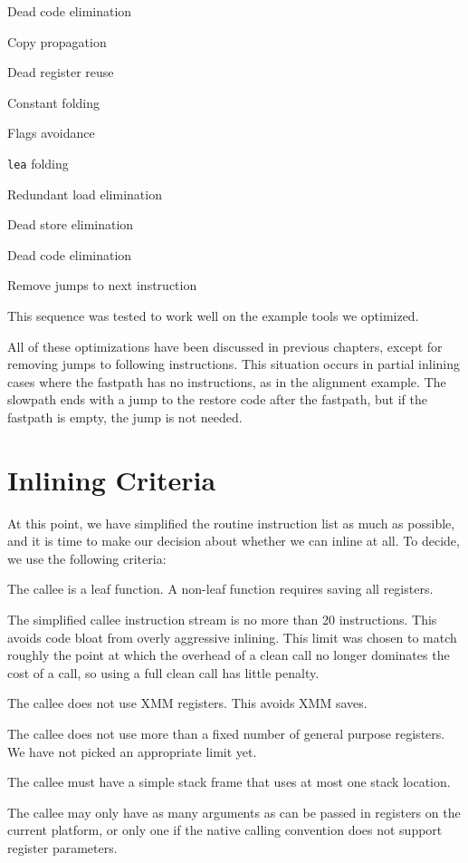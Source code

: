 \begin{packed_enumerate}
\item Dead code elimination
\item Copy propagation
\item Dead register reuse
\item Constant folding
\item Flags avoidance
\item {\tt lea} folding
\item Redundant load elimination
\item Dead store elimination
\item Dead code elimination
\item Remove jumps to next instruction
\end{packed_enumerate}

This sequence was tested to work well on the example tools we optimized.

All of these optimizations have been discussed in previous chapters, except for
removing jumps to following instructions.  This situation occurs in partial
inlining cases where the fastpath has no instructions, as in the alignment
example.  The slowpath ends with a jump to the restore code after the fastpath,
but if the fastpath is empty, the jump is not needed.

\section{Inlining Criteria}

At this point, we have simplified the routine instruction list as much as
possible, and it is time to make our decision about whether we can inline at
all.  To decide, we use the following criteria:

\begin{packed_itemize}
\item The callee is a leaf function.  A non-leaf function requires saving all
registers.
\item The simplified callee instruction stream is no more than 20 instructions.
This avoids code bloat from overly aggressive inlining.  This limit was chosen
to match roughly the point at which the overhead of a clean call no longer
dominates the cost of a call, so using a full clean call has little penalty.
\item The callee does not use XMM registers.  This avoids XMM saves.
\item The callee does not use more than a fixed number of general purpose
registers.  We have not picked an appropriate limit yet.
\item The callee must have a simple stack frame that uses at most one stack
location.
\item The callee may only have as many arguments as can be passed in registers
on the current platform, or only one if the native calling convention does not
support register parameters.
\end{packed_itemize}

